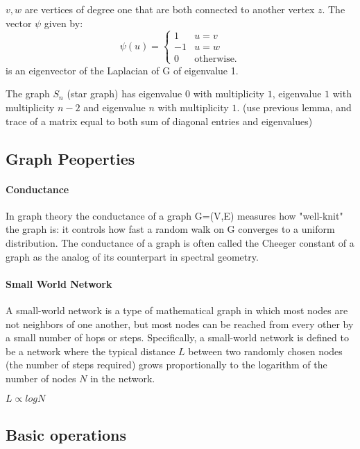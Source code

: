 \begin{lemma}
  $ v, w $ are vertices of degree one that are both connected to another vertex $z$. The vector $\psi$ given by:
$$ \psi (u) = 
  \begin{cases}
    1 & u = v \\
    -1 & u = w \\
    0 & \text{otherwise.}
  \end{cases}
$$
is an eigenvector of the Laplacian of G of eigenvalue 1.
\end{lemma}

\begin{lemma}
The graph $ S_n $ (star graph) has eigenvalue $0$ with multiplicity $1$, eigenvalue $1$ with multiplicity $ n - 2 $ and eigenvalue $n$ with multiplicity $1$.
(use previous lemma, and trace of a matrix equal to both sum of diagonal entries and eigenvalues)
\end{lemma}


\subsection{Graph Peoperties}
\paragraph{Conductance}
In graph theory the conductance of a graph G=(V,E) measures how "well-knit" the graph is: it controls how fast a random walk on G converges to a uniform distribution.
The conductance of a graph is often called the Cheeger constant of a graph as the analog of its counterpart in spectral geometry.

\paragraph{Small World Network}
A small-world network is a type of mathematical graph in which most nodes are not neighbors of one another, but most nodes can be reached from every other by a small
number of hops or steps. Specifically, a small-world network is defined to be a network where the typical distance $L$ between two randomly chosen nodes (the number of
steps required) grows proportionally to the logarithm of the number of nodes $N$ in the network.

$\displaystyle L\propto logN$

\subsection{Basic operations} 








